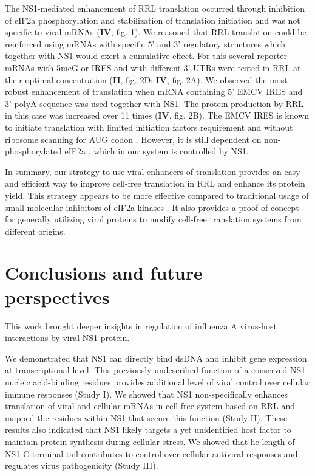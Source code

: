 		The NS1-mediated enhancement of \gls{RRL} translation occurred through inhibition of \gls{eIF2a} phosphorylation and stabilization of translation initiation and was not specific to viral mRNAs (\textbf{IV}, fig. 1). We reasoned that \gls{RRL} translation could be reinforced using mRNAs with specific 5' and 3' regulatory structures which together with \gls{NS1} would exert a cumulative effect. For this several reporter mRNAs with \gls{5meG} or \gls{IRES} and with different 3' \gls{UTR}s were tested in RRL at their optimal concentration (\textbf{II}, fig. 2D; \textbf{IV}, fig. 2A). We observed the most robust enhancement of translation when mRNA containing 5' \gls{EMCV} \gls{IRES} and 3' \gls{polyA} sequence was used together with NS1. The protein production by RRL in this case was increased over 11 times (\textbf{IV}, fig. 2B). The \gls{EMCV} \gls{IRES} is known to initiate translation with limited initiation factors requirement and without ribosome scanning for AUG codon \parencite{Pestova2001}. However, it is still dependent on non-phosphorylated \gls{eIF2a} \parencite{Terenin2008}, which in our system is controlled by NS1. 
	
		In summary, our strategy to use viral enhancers of translation provides an easy and efficient way to improve cell-free translation in \gls{RRL} and enhance its protein yield. This strategy appears to be more effective compared to traditional usage of small molecular inhibitors of \gls{eIF2a} kinases \parencite{Jammi2003}. It also provides a proof-of-concept for generally utilizing viral proteins to modify cell-free translation systems from different origins.
	
\newpage
\section{Conclusions and future perspectives}

	This work brought deeper insights in regulation of influenza A virus-host interactions by viral NS1 protein.
	
	We demonstrated that NS1 can directly bind dsDNA and inhibit gene expression at transcriptional level. This previously undescribed function of a conserved NS1 nucleic acid-binding residues provides additional level of viral control over cellular immune responses (Study I). We showed that NS1 non-specifically enhances translation of viral and cellular mRNAs in cell-free system based on \gls{RRL} and mapped the residues within NS1 that secure this function (Study II). These results also indicated that NS1 likely targets a yet unidentified host factor to maintain protein synthesis during cellular stress. We showed that he length of NS1 C-terminal tail contributes to control over cellular antiviral responses and regulates virus pathogenicity (Study III). 
	

